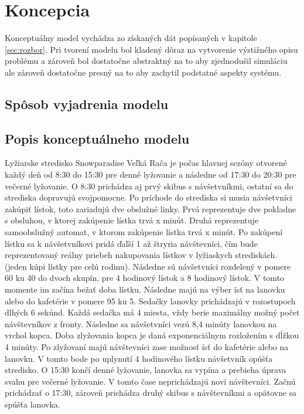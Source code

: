 \section{Koncepcia}
Konceptuálny model vychádza zo získaných dát popísaných v kapitole \ref{sec:rozbor}. Pri tvorení modelu bol kladený dôraz
na vytvorenie výstižného opisu problému a zároveň bol dostatočne abstraktný na to aby zjednodušil simuláciu ale zároveň dostatočne presný na to aby zachytil podstatné aspekty systému. 

\subsection{Spôsob vyjadrenia modelu}

\subsection{Popis konceptuálneho modelu}
Lyžiarske stredisko Snowparadise Veľká Rača je počas hlavnej sezóny otvorené každý deň od 8:30 do 15:30 pre denné lyžovanie a následne 
od 17:30 do 20:30 pre večerné lyžovanie. O 8:30 prichádza aj prvý skibus s návšetvníkmi, ostatní sa do strediska dopravujú svojpomocne. Po príchode do strediska si musia návšetvníci zakúpiť lístok, toto zariadujú dve obslužné linky. Prvá reprezentuje dve pokladne s obsluhou,
v ktorej zakúpenie lístka trvá x minút. Druhá reprezentuje samoobslužný automat, v ktorom zakúpenie lístka trvá x minút.
Po zakúpení lístku sa k návšetvníkovi pridá ďaľší 1 až štryria návštevníci, čím bude reprezentovaný reálny priebeh nakupovania lístkov v lyžiaskych strediskách.
(jeden kúpi lístky pre celú rodinu). Následne sú návšetvníci rozdelený v pomere 60 ku 40 do dvoch skupín, pre 4 hodinový lístok a 8 hodinový lístok.
V tomto momente im začína bežať doba lístku. Následne majú na výber ísť na lanovku alebo do kafetérie v pomere 95 ku 5. Sedačky lanovky 
prichádzajú v rozostupoch dlhých 6 sekúnd. Každá sedačka má 4 miesta, vždy berie maximálny možný počet návštevníkov z fronty. Následne
sa návšetvníci vezú 8,4 minúty lanovkou na vrchol kopca. Doba zlyžovania kopca je daná exponenciálnym rozložením s dĺžkou 4 minúty.
Po zlyžovaní majú návštevníci zase možnosť ísť do kafetérie alebo na lanovku. V tomto bode po uplynutí 4 hodinového lístku návšetvník opúšťa stredisko.
O 15:30 končí denné lyžovanie, lanovka sa vypína a prebieha úprava svahu pre večerné lyžovanie. V tomto čase neprichádzajú noví návštevníci.
Začnú prichádzať o 17:30, zároveň prichádza druhý skibus s návštevníkmi a opätovne sa spúšťa lanovka. 
